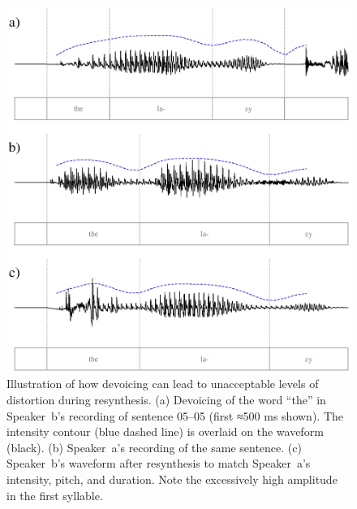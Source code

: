 \begin{figure}
	\begin{centering}
	\includegraphics{figures/devoicing/devoicing.eps}
	\caption[Syllable devoicing in resynthesis]{Illustration of how devoicing can lead to unacceptable levels of distortion during resynthesis.  (a) Devoicing of the word “the” in Speaker~\ac{b}’s recording of sentence 05–05 (first ≈500 ms shown).  The intensity contour (blue dashed line) is overlaid on the waveform (black).  (b) Speaker~\ac{a}’s recording of the same sentence.  (c) Speaker~\ac{b}’s waveform after resynthesis to match Speaker~\ac{a}’s intensity, pitch, and duration.  Note the excessively high amplitude in the first syllable.\label{fig:Devoicing}}
	\end{centering}
\end{figure}

